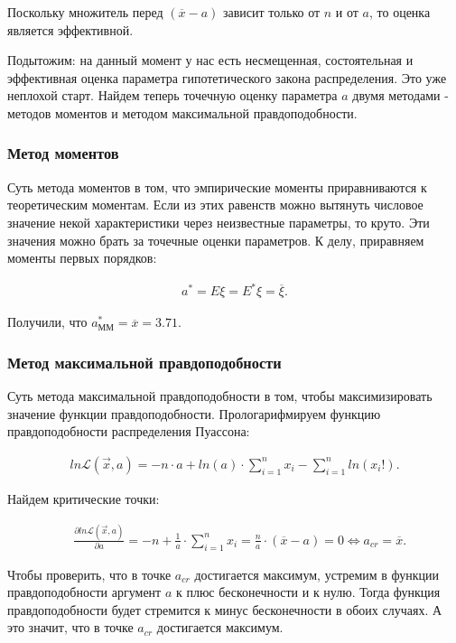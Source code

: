 \documentclass[14pt,a4paper]{scrartcl}
\theoremstyle{definition}
\theoremstyle{remark}
\theoremstyle{definition}
\theoremstyle{definition}
\begin{document}
Поскольку множитель перед $(\overline{x} - a)$ зависит только от $n$ и от $a$, то оценка является эффективной.

Подытожим: на данный момент у нас есть несмещенная, состоятельная и эффективная оценка параметра гипотетического закона распределения. Это уже неплохой старт. Найдем теперь точечную оценку параметра $a$ двумя методами - методов моментов и методом максимальной правдоподобности.

\subsubsection{Метод моментов}

Суть метода моментов в том, что эмпирические моменты приравниваются к теоретическим моментам. Если из этих равенств можно вытянуть числовое значение некой характеристики через неизвестные параметры, то круто. Эти значения можно брать за точечные оценки параметров. К делу, приравняем моменты первых порядков:

\begin{align*}
  a^{*} = E\xi = E^{*}\xi = \overline{\xi}.
\end{align*}

Получили, что $a_{\text{ММ}}^{*} = \overline{x} = 3.71.$

\subsubsection{Метод максимальной правдоподобности}

Суть метода максимальной правдоподобности в том, чтобы максимизировать значение функции правдоподобности. Прологарифмируем функцию правдоподобности распределения Пуассона:

\begin{align*}
  ln \mathcal{L}(\vec{x}, a) = -n\cdot a + ln(a)\cdot \sum_{i = 1}^{n} x_i - \sum_{i = 1}^{n} ln(x_i!).
\end{align*}

Найдем критические точки:

\begin{align*}
  &\frac{\partial ln \mathcal{L}(\vec{x}, a)}{\partial a} = -n + \frac{1}{a}\cdot \sum_{i = 1}^{n} x_i = \frac{n}{a}\cdot (\overline{x} - a) = 0 \iff a_{cr} = \overline{x}.
\end{align*}

Чтобы проверить, что в точке $a_{cr}$ достигается максимум, устремим в функции правдоподобности аргумент $a$ к плюс бесконечности и к нулю. Тогда функция правдоподобности будет стремится к минус бесконечности в обоих случаях. А это значит, что в точке $a_{cr}$ достигается максимум.
\end{document}
